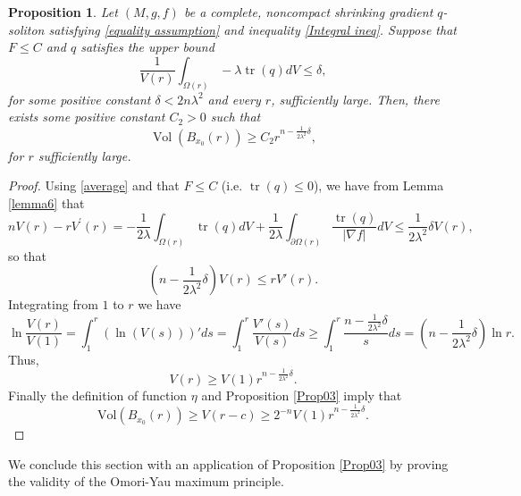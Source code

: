 \documentclass{amsart}
\theoremstyle{plain}
\newtheorem{proposition}[theorem]{\bf Proposition}
\numberwithin{equation}{section}
\begin{document}
\begin{proposition}
    Let $(M,g,f)$ be a complete, noncompact  shrinking gradient $q$-soliton satisfying \eqref{equality assumption} and  inequality \eqref{Integral ineq}. Suppose that $F\leq C$ and $q$ satisfies the upper bound \begin{equation}\label{average}
        \frac{1}{V(r)}\int_{\Omega(r)}-\lambda\operatorname{tr}(q) dV \leq \delta,
    \end{equation}
    for some positive constant $\delta <2n\lambda^2$ and every $r$, sufficiently large. Then, there exists some positive constant $C_2>0$ such that \begin{equation*}
    \operatorname{Vol}\left(B_{x_0}(r)\right)\geq C_2 r^{n-\frac{1}{2\lambda^2}\delta},
\end{equation*}
for $r$ sufficiently large.
\end{proposition}
\begin{proof}
    Using \eqref{average} and that $F\leq C$ (i.e. $\operatorname{tr}(q)\leq 0$), we have from Lemma \ref{lemma6} that
    $$
    nV(r)-rV^{\prime}(r)= -\frac{1}{2\lambda}\int_{\Omega(r)}\operatorname{tr}(q) dV +\frac{1}{2\lambda} \int_{\partial \Omega(r)} \frac{\operatorname{tr}(q)}{|\nabla f|}dV\leq\frac{1}{2\lambda^2}\delta V(r),$$
    so that
\begin{equation}
    \left(n-\frac{1}{2\lambda^2}\delta\right)V(r)\leq rV'(r).
\end{equation}
Integrating from $1$ to $r$ we have
$$\ln\frac{V(r)}{V(1)}=\int_1^r(\ln(V(s)))'ds=\int_1^r\frac{V'(s)}{V(s)}ds\geq\int_1^r\frac{n-\frac{1}{2\lambda^2}\delta}{s}ds=\left(n-\frac{1}{2\lambda^2}\delta\right)\ln r.$$
Thus,
$$V(r)\geq V(1)r^{n-\frac{1}{2\lambda^2}\delta}.$$
Finally the definition of function $\eta$ and Proposition \ref{Prop03} imply that
$$\text{Vol}(B_{x_0}(r))\geq V(r-c)\geq 2^{-n}V(1)r^{n-\frac{1}{2\lambda^2}\delta}.$$
\end{proof}

We conclude this section with an application of Proposition \ref{Prop03} by proving the validity of the Omori-Yau maximum principle.
\end{document}
